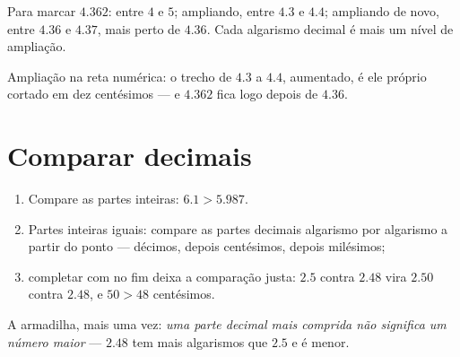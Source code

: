 \begin{example}\label{ex:g5:decimals:line}
Para marcar $4.362$: entre $4$ e $5$; ampliando, entre $4.3$ e $4.4$;
ampliando de novo, entre $4.36$ e $4.37$, mais perto de $4.36$. Cada
algarismo decimal é mais um nível de ampliação.
\end{example}

\begin{omfigure}

{\small Ampliação na reta numérica: o trecho de $4.3$ a $4.4$,
aumentado, é ele próprio cortado em dez centésimos --- e $4.362$ fica
logo depois de $4.36$.}
\end{omfigure}

\section{Comparar decimais}

\begin{method}\label{met:g5:decimals:compare}
\begin{enumerate}
  \item Compare as partes inteiras: $6.1 > 5.987$.
  \item Partes inteiras iguais: compare as partes decimais algarismo
        por algarismo a partir do ponto --- décimos, depois
        centésimos, depois milésimos;
  \item completar com  no fim deixa a comparação justa: $2.5$
        contra $2.48$ vira $2.50$ contra $2.48$, e $50 > 48$
        centésimos.
\end{enumerate}
A armadilha, mais uma vez: \emph{uma parte decimal mais comprida não
significa um número maior} --- $2.48$ tem mais algarismos que $2.5$ e
é menor.
\end{method}

